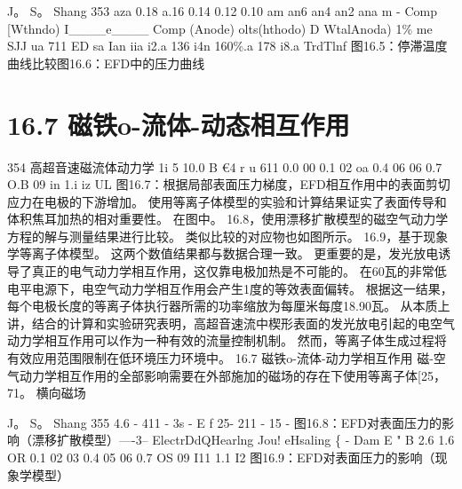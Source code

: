\documentclass[UTF8,11pt,a4paper,openany,fontset=fandol]{ctexbook}
\begin{document}
J。 S。 Shang 353 aza 0.18 a.16 0.14 0.12 0.10 am an6 an4 an2 ana m - Comp [Wthndo) I\_\_\_\_e\_\_\_\_ Comp (Anode) olts(hthodo) D WtalAnoda) 1\% me SJJ ua 711 ED sa Ian iia i2.a 136 i4n 160\%.a 178 i8.a TrdTlnf 图16.5：停滞温度曲线比较图16.6：EFD中的压力曲线

\section{16.7 磁铁o-流体-动态相互作用}
354 高超音速磁流体动力学 1i 5 10.0 B €4 r u 611 0.0 00 0.1 02 oa 0.4 06 06 0.7 O.B 09 in 1.i iz UL 图16.7：根据局部表面压力梯度，EFD相互作用中的表面剪切应力在电极的下游增加。 使用等离子体模型的实验和计算结果证实了表面传导和体积焦耳加热的相对重要性。 在图中。 16.8，使用漂移扩散模型的磁空气动力学方程的解与测量结果进行比较。 类似比较的对应物也如图所示。 16.9，基于现象学等离子体模型。 这两个数值结果都与数据合理一致。 更重要的是，发光放电诱导了真正的电气动力学相互作用，这仅靠电极加热是不可能的。 在60瓦的非常低电平电源下，电空气动力学相互作用会产生1度的等效表面偏转。 根据这一结果，每个电极长度的等离子体执行器所需的功率缩放为每厘米每度18.90瓦。 从本质上讲，结合的计算和实验研究表明，高超音速流中楔形表面的发光放电引起的电空气动力学相互作用可以作为一种有效的流量控制机制。 然而，等离子体生成过程将有效应用范围限制在低环境压力环境中。 16.7 磁铁o-流体-动力学相互作用 磁-空气动力学相互作用的全部影响需要在外部施加的磁场的存在下使用等离子体[25，71。 横向磁场

J。 S。 Shang 355 4.6 - 411 - 3s - E f 25- 211 - 15 - 图16.8：EFD对表面压力的影响（漂移扩散模型）----3-- ElectrDdQHearlng Jou! eHsaling \{ - Dam E " B 2.6 1.6 OR 0.1 02 03 0.4 05 06 0.7 OS 09 I11 1.1 I2 图16.9：EFD对表面压力的影响（现象学模型）
\end{document}
